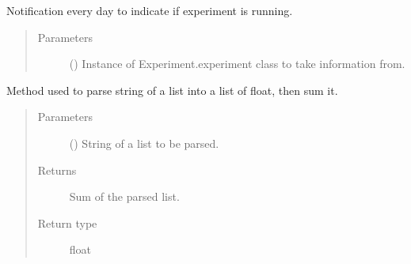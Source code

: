 \documentclass[letterpaper,10pt,english]{sphinxmanual}
\begin{document}

\begin{fulllineitems}
\label{\detokenize{NoSeMazeControl/HelperFunctions:HelperFunctions.Email.deadmans_switch}}
\pysigstartsignatures
{}
\pysigstopsignatures
\sphinxAtStartPar
Notification every day to indicate if experiment is running.
\begin{quote}\begin{description}
\item[{Parameters}] \leavevmode
\sphinxAtStartPar
{} () \textendash{} Instance of Experiment.experiment class to take information from.

\end{description}\end{quote}

\end{fulllineitems}


\begin{fulllineitems}
\label{\detokenize{NoSeMazeControl/HelperFunctions:HelperFunctions.Email.parse_list}}
\pysigstartsignatures
{}
\pysigstopsignatures
\sphinxAtStartPar
Method used to parse string of a list into a list of float, then sum it.
\begin{quote}\begin{description}
\item[{Parameters}] \leavevmode
\sphinxAtStartPar
{} () \textendash{} String of a list to be parsed.

\item[{Returns}] \leavevmode
\sphinxAtStartPar
{} \textendash{} Sum of the parsed list.

\item[{Return type}] \leavevmode
\sphinxAtStartPar
float

\end{description}\end{quote}

\end{fulllineitems}
\end{document}
